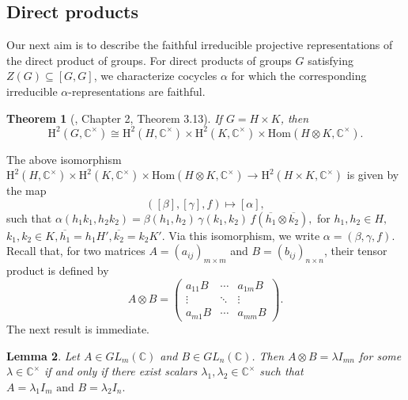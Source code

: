 \documentclass[a4paper,11pt]{amsart}
\numberwithin{equation}{section}
\numberwithin{equation}{subsection}
\newtheorem{theorem}{Theorem}[section]
\newtheorem{lemma}[theorem]{Lemma}
\begin{document}
	\subsection{Direct products} Our next aim is to describe the faithful irreducible projective representations of the direct product of groups. 
	For direct products of groups $G$ satisfying $Z(G) \subseteq [G, G]$, we characterize cocycles $\alpha$ for which the corresponding irreducible $\alpha$-representations are faithful.   
	\begin{theorem}[\cite{karpilovsky}, Chapter 2, Theorem 3.13] \label{schur multiplier of direct product}
		If $G = H \times K$, then 
		$$
		\mathrm{H}^2(G, \mathbb{C}^{\times}) \cong\mathrm{H}^2(H, \mathbb{C}^{\times}) \times \mathrm{H}^2(K, \mathbb{C}^{\times}) \times \mathrm{Hom}(H \otimes K, \mathbb{C}^{\times}).$$ 
	\end{theorem}
	The above isomorphism $\mathrm{H}^2(H, \mathbb{C}^{\times}) \times \mathrm{H}^2(K, \mathbb{C}^{\times}) \times \mathrm{Hom}(H \otimes K, \mathbb{C}^{\times}) \to \mathrm{H}^2(H \times K, \mathbb{C}^{\times})$ is given 
	by the map
	\[
	([\beta],[\gamma],f) \longmapsto [\alpha], 
	\]
	such that $\alpha(h_1k_1,h_2k_2)= \beta(h_1,h_2)\,\gamma(k_1,k_2)\,f(\overline{h_1}\otimes\overline{k_2}), $ for $ h_1,h_2 \in H, $  $k_1,k_2 \in K, \overline{h_1}= h_1H', \overline{k_2}= k_2K'$.
	Via this isomorphism, we write $\alpha=(\beta,\gamma,f)$. \\
	
	
	
	Recall that, for two matrices $A=(a_{ij})_{m\times m}$ and $B=(b_{ij})_{n\times n}$, their tensor product is defined by
	\[
	A \otimes B
	=
	\begin{pmatrix}
		a_{11}B & \cdots & a_{1m}B \\
		\vdots  & \ddots & \vdots \\
		a_{m1}B & \cdots & a_{mm}B
	\end{pmatrix}.
	\]
	The next result is immediate.
	\begin{lemma} \label{tensor product of matrices}
		Let $A \in GL_m(\mathbb{C})$ and $B \in GL_n(\mathbb{C})$. Then $A \otimes B = \lambda I_{mn}$ for some $\lambda \in \mathbb{C}^\times$ if and only if there exist scalars $\lambda_1, \lambda_2 \in \mathbb{C}^\times$ such that $A = \lambda_1 I_m \text{ and } B = \lambda_2 I_n.$
	\end{lemma}
	
\end{document}
